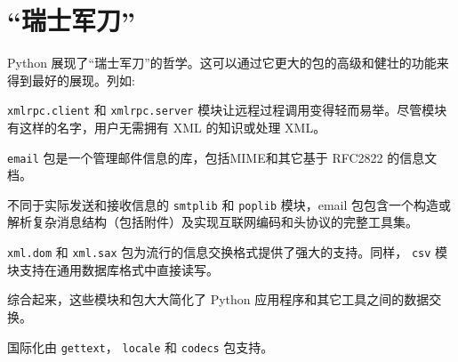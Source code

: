 \section{“瑞士军刀”}
Python 展现了“瑞士军刀”的哲学。这可以通过它更大的包的高级和健壮的功能来得到最好的展现。列如:
\begin{compactitem}
    \item \texttt{xmlrpc.client} 和 \texttt{xmlrpc.server} 模块让远程过程调用变得轻而易举。尽管模块有这样的名字，用户无需拥有 XML 的知识或处理 XML。
    \item \texttt{email} 包是一个管理邮件信息的库，包括MIME和其它基于 RFC2822 的信息文档。

        不同于实际发送和接收信息的 \texttt{smtplib} 和 \texttt{poplib} 模块，email 包包含一个构造或解析复杂消息结构（包括附件）及实现互联网编码和头协议的完整工具集。
    \item \texttt{xml.dom} 和 \texttt{xml.sax} 包为流行的信息交换格式提供了强大的支持。同样， \texttt{csv} 模块支持在通用数据库格式中直接读写。

        综合起来，这些模块和包大大简化了 Python 应用程序和其它工具之间的数据交换。
    \item 国际化由 \texttt{gettext}， \texttt{locale} 和 \texttt{codecs} 包支持。
\end{compactitem} 